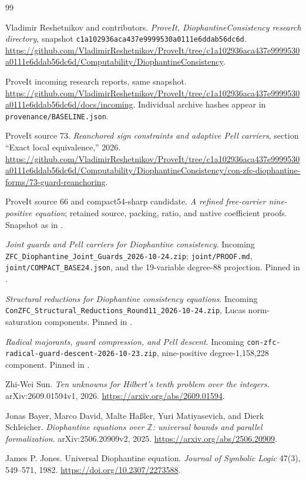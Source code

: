 \documentclass[11pt]{article}
\theoremstyle{definition}
\theoremstyle{remark}
\newcommand{\Z}{\mathbb Z}
\newcommand{\file}[1]{\nolinkurl{#1}}
\begin{document}
\begingroup
\small
\begin{thebibliography}{99}
\raggedright
{}
Vladimir Reshetnikov and contributors.
\emph{ProveIt, DiophantineConsistency research directory}, snapshot
\texttt{c1a102936aca437e9999530a0111e6ddab56dc6d}.
\url{https://github.com/VladimirReshetnikov/ProveIt/tree/c1a102936aca437e9999530a0111e6ddab56dc6d/Computability/DiophantineConsistency}.

ProveIt incoming research reports, same snapshot.
\url{https://github.com/VladimirReshetnikov/ProveIt/tree/c1a102936aca437e9999530a0111e6ddab56dc6d/docs/incoming}.
Individual archive hashes appear in \file{provenance/BASELINE.json}.

ProveIt source 73.
\emph{Reanchored sign constraints and adaptive Pell carriers},
section ``Exact local equivalence,'' 2026.
\url{https://github.com/VladimirReshetnikov/ProveIt/tree/c1a102936aca437e9999530a0111e6ddab56dc6d/Computability/DiophantineConsistency/con-zfc-diophantine-forms/73-guard-reanchoring}.

ProveIt source 66 and compact54-sharp candidate.
\emph{A refined free-carrier nine-positive equation}; retained source,
packing, ratio, and native coefficient proofs. Snapshot as in \cite{repo}.

\emph{Joint guards and Pell carriers for Diophantine consistency}.
Incoming \file{ZFC_Diophantine_Joint_Guards_2026-10-24.zip};
\file{joint/PROOF.md}, \file{joint/COMPACT_BASE24.json}, and
the 19-variable degree-88 projection. Pinned in \cite{incoming}.

\emph{Structural reductions for Diophantine consistency equations}.
Incoming \file{ConZFC_Structural_Reductions_Round11_2026-10-24.zip},
Lucas norm-saturation components. Pinned in \cite{incoming}.

\emph{Radical majorants, guard compression, and Pell descent}.
Incoming \file{con-zfc-radical-guard-descent-2026-10-23.zip},
nine-positive degree-1,158,228 component. Pinned in \cite{incoming}.

Zhi-Wei Sun.
\emph{Ten unknowns for Hilbert's tenth problem over the integers}.
arXiv:2609.01594v1, 2026.
\url{https://arxiv.org/abs/2609.01594}.

Jonas Bayer, Marco David, Malte Ha{\ss}ler, Yuri Matiyasevich,
and Dierk Schleicher.
\emph{Diophantine equations over $\Z$: universal bounds and parallel
formalization}. arXiv:2506.20909v2, 2025.
\url{https://arxiv.org/abs/2506.20909}.

James P. Jones.
Universal Diophantine equation.
\emph{Journal of Symbolic Logic} 47(3), 549--571, 1982.
\url{https://doi.org/10.2307/2273588}.
\end{thebibliography}
\endgroup
\end{document}
